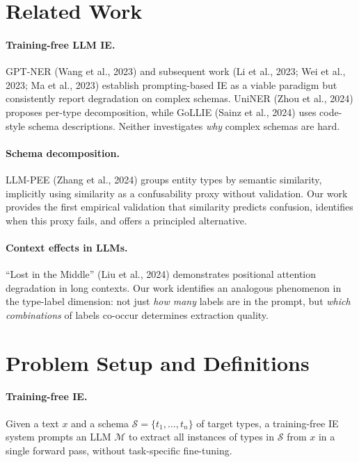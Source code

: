 \documentclass[11pt,a4paper]{article}
\begin{document}
\section{Related Work}
\label{sec:related}

\paragraph{Training-free LLM IE.}
GPT-NER (Wang et al., 2023) and subsequent work (Li et al., 2023; Wei et al., 2023; Ma et al., 2023) establish prompting-based IE as a viable paradigm but consistently report degradation on complex schemas.
UniNER (Zhou et al., 2024) proposes per-type decomposition, while GoLLIE (Sainz et al., 2024) uses code-style schema descriptions.
Neither investigates \emph{why} complex schemas are hard.

\paragraph{Schema decomposition.}
LLM-PEE (Zhang et al., 2024) groups entity types by semantic similarity, implicitly using similarity as a confusability proxy without validation.
Our work provides the first empirical validation that similarity predicts confusion, identifies when this proxy fails, and offers a principled alternative.

\paragraph{Context effects in LLMs.}
``Lost in the Middle'' (Liu et al., 2024) demonstrates positional attention degradation in long contexts.
Our work identifies an analogous phenomenon in the type-label dimension: not just \emph{how many} labels are in the prompt, but \emph{which combinations} of labels co-occur determines extraction quality.

\section{Problem Setup and Definitions}
\label{sec:setup}

\paragraph{Training-free IE.}
Given a text $x$ and a schema $\mathcal{S} = \{t_1, \ldots, t_n\}$ of target types, a training-free IE system prompts an LLM $\mathcal{M}$ to extract all instances of types in $\mathcal{S}$ from $x$ in a single forward pass, without task-specific fine-tuning.
\end{document}
